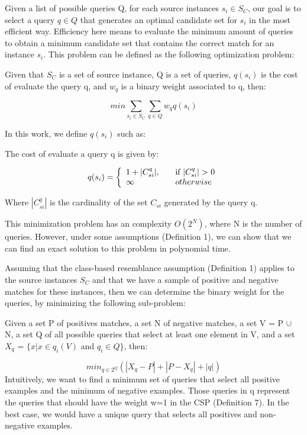 Given a list of possible queries Q,  for each source instances $s_i \in S_C$, our goal is to select a query $q \in Q$ that generates an optimal candidate set for $s_i$ in the most efficient way. Efficiency here means to evaluate the minimum amount of queries to obtain a minimum candidate set that contains the correct match for an instance $s_i$. This problem can be defined as the following optimization problem:

\begin{definition} Given that $S_C$ is a set of source instance, Q is a set of queries, $q(s_i)$ is the cost of evaluate the query q, and $w_q$  is a binary weight associated to q, then:
\end{definition}  
\[
min \sum_{s_i \in S_C} \sum_{q \in Q} w_qq(s_i)
\]



In this work, we define $q(s_i)$ such as:

\begin{definition}  The cost of evaluate a query q is given by:

\[
  q(s_i) = \left\{
  \begin{array}{l l} 
      1 + |C_{si}^q|,  & \quad \text{if $|C_{si}^q|>$  0}\\
      \infty & \quad otherwise\\
  \end{array} \right.
\]
 
 
Where $|C_{si}^q|$ is the cardinality of the set $C_{si}$ generated by the query q.
\end{definition}  

This minimization problem has an complexity $O(2^N)$, where N is the number of queries. However, under some assumptions (Definition 1), we can show that we can find an exact solution to this problem in polynomial time. 

Assuming that the class-based resemblance assumption (Definition 1) applies to the source instances $S_C$ and that we have a sample of positive and negative  matches for these instances, then we can determine the binary weight for the queries, by minimizing the following sub-problem:

\begin{definition}Given a set P of positives matches, a set N of negative matches, a set V = P $\cup$ N, a set Q of all possible queries that select at least one element in V, and a set $X_q$ = $\{x | x \in q_i(V)$ and $q_i \in Q\}$, then:
\end{definition}  
\[
min_{q \in 2^Q} (|X_q- P| +|P - X_q| + |q|)
\]
Intuitively, we want to find a minimum set of queries that select all positive examples and the minimum of negative examples. Those queries in q represent the queries that should have the weight w=1 in the CSP (Definition 7). In the best case, we would have a unique query that selects all positives and non-negative examples. 

